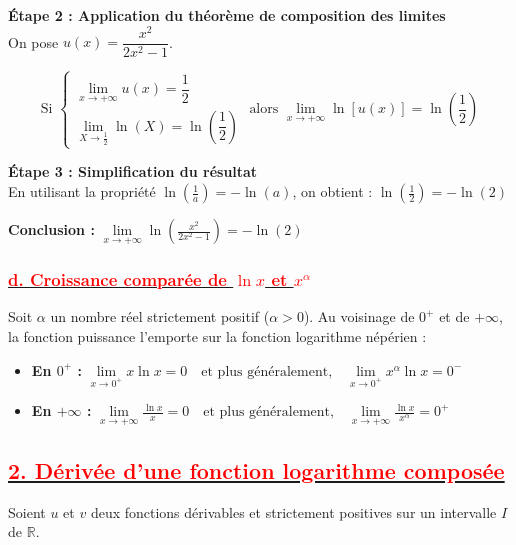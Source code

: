 \documentclass[12pt,a4paper]{article}
\begin{document}
\textbf{Étape 2 : Application du théorème de composition des limites}\\
On pose $u(x) = \dfrac{x^2}{2x^2 - 1}$. 

\[
\text{Si }
\begin{cases}
\lim\limits_{x \to +\infty} u(x) = \dfrac{1}{2} \\[2mm]
\lim\limits_{X \to \frac{1}{2}} \ln(X) = \ln\left(\dfrac{1}{2}\right)
\end{cases}
\text{ alors } \lim_{x \to +\infty} \ln\left[u(x)\right] = \ln\left(\frac{1}{2}\right)
\]

\textbf{Étape 3 : Simplification du résultat}\\
En utilisant la propriété $\ln\left(\frac{1}{a}\right) = -\ln(a)$, on obtient :
                $\ln\left(\frac{1}{2}\right) = -\ln(2)$

\textbf{Conclusion :}
$\displaystyle \lim\limits_{x \to +\infty} \ln\left(\frac{x^2}{2x^2 - 1}\right) = -\ln(2)$

\subsubsection*{\underline{\textbf{\textcolor{red}{d. Croissance comparée de \(\ln x\) et \(x^\alpha\) }}}}
Soit $\alpha$ un nombre réel strictement positif ($\alpha > 0$). 
Au voisinage de $0^+$ et de $+\infty$, la fonction puissance l'emporte sur la fonction logarithme népérien :

\begin{itemize}
    \item \textbf{En $0^+$ :} 
    \(
    \lim\limits_{x \to 0^+} x \ln x = 0 \quad \text{et plus généralement,} \quad \lim\limits_{x \to 0^+} x^{\alpha} \ln x = 0^{-}
    \)
    
    \item \textbf{En $+\infty$ :} 
    \(
    \lim\limits_{x \to +\infty} \frac{\ln x}{x} = 0 \quad \text{et plus généralement,} \quad \lim\limits_{x \to +\infty} \frac{\ln x}{x^{\alpha}} = 0^{+}
    \)
\end{itemize}

\subsection*{\underline{\textbf{\textcolor{red}{2. Dérivée d'une fonction logarithme composée}}}}

Soient $u$ et $v$ deux fonctions dérivables et strictement positives sur un intervalle $I$ de $\mathbb{R}$.
\end{document}
